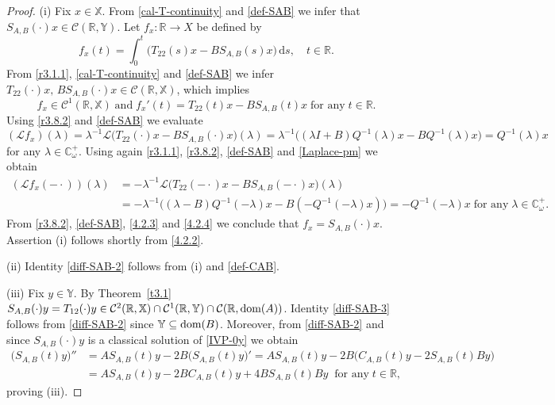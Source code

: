 \documentclass[11pt]{amsart}
\numberwithin{equation}{section}
\newcommand{\SAB}{S_{A,B}}
\newcommand{\CAB}{C_{A,B}}
\newcommand{\RR}{{\mathbb R}}
\newcommand{\rmd}{{\mathrm{d}}}
\theoremstyle{remark}
\theoremstyle{definition}
\newcommand\bX{{\mathbb X}}
\newcommand\bY{{\mathbb Y}}
\newcommand{\dom}{\text{\rm{dom}}}
\begin{document}
\begin{proof}
	(i) Fix $x \in \bX$. From \eqref{cal-T-continuity} and \eqref{def-SAB} we infer that $\SAB(\cdot)x\in\mathcal{C}(\mathbb{R},\bY)$. Let $f_x : \mathbb{R} \to X$ be defined by
	\begin{equation}\label{4.2.1}
		f_x(t) = \int_0^t \bigl(T_{22}(s)x - B\SAB(s)x\bigr)\,\rmd s, \quad t \in \mathbb{R}. 
	\end{equation}
	From \eqref{r3.1.1}, \eqref{cal-T-continuity} and \eqref{def-SAB} we infer $T_{22}(\cdot)x,\, B\SAB(\cdot)x \in \mathcal{C}(\mathbb{R},\bX)$, which implies 
	\begin{equation}\label{4.2.2}
		f_x \in \mathcal{C}^1(\mathbb{R},\bX) \; \text{and} \; f_x'(t) = T_{22}(t)x - B\SAB(t)x\;\text{for any}\; t\in\RR. 
	\end{equation}
	Using \eqref{r3.8.2} and \eqref{def-SAB} we evaluate
	\begin{equation}\label{4.2.3}
		(\mathcal{L}f_x)(\lambda)
		= \lambda^{-1}\mathcal{L}\bigl(T_{22}(\cdot)x - B\SAB(\cdot)x\bigr)(\lambda)
		=\lambda^{-1}\bigl((\lambda I+B)Q^{-1}(\lambda)x - BQ^{-1}(\lambda)x\bigr)
		= Q^{-1}(\lambda)x
	\end{equation}
	for any $\lambda \in \mathbb{C}_\omega^+$. Using again \eqref{r3.1.1},  \eqref{r3.8.2}, \eqref{def-SAB} and \eqref{Laplace-pm} we obtain 
	\begin{align}\label{4.2.4}
		(\mathcal{L}f_x(-\cdot))(\lambda)
		&=-\lambda^{-1}\mathcal{L}\bigl(T_{22}(-\cdot)x - B\SAB(-\cdot)x\bigr)(\lambda)
		\nonumber\\
		&=-\lambda^{-1}\bigl((\lambda-B)Q^{-1}(-\lambda)x - B(-Q^{-1}(-\lambda)x)\bigr)=-Q^{-1}(-\lambda)x\;\mbox{for any}\;\lambda \in \mathbb{C}_\omega^+.
	\end{align}
	From \eqref{r3.8.2}, \eqref{def-SAB}, \eqref{4.2.3} and \eqref{4.2.4} we conclude that $f_x = \SAB(\cdot)x$. Assertion (i) follows shortly from \eqref{4.2.2}.
	
	(ii) Identity \eqref{diff-SAB-2} follows from (i) and \eqref{def-CAB}.
	
	(iii) Fix $y\in\bY$. By Theorem~\ref{t3.1} $\SAB(\cdot)y = T_{12}(\cdot)y \in \mathcal{C}^2(\mathbb{R},\bX) \cap \mathcal{C}^1(\mathbb{R},\bY) \cap \mathcal{C}(\mathbb{R},\dom(A))$.
	Identity \eqref{diff-SAB-3} follows from \eqref{diff-SAB-2} since $\bY \subseteq \dom(B)$. Moreover, from \eqref{diff-SAB-2} and since $\SAB(\cdot)y$ is a classical solution of \eqref{IVP-0y} we obtain
	\begin{align}\label{4.2.5}
		\bigl(\SAB(t)y\bigr)''
		&= A\SAB(t)y - 2B\bigl(\SAB(t)y\bigr)'= A\SAB(t)y - 2B\bigl(\CAB(t)y - 2\SAB(t)By\bigr) \nonumber\\
		&= A\SAB(t)y - 2BC_{A,B}(t)y + 4B\SAB(t)By \;\;\mbox{for any}\;t\in\RR,
	\end{align}
	proving (iii).
	

\end{proof}
\end{document}
